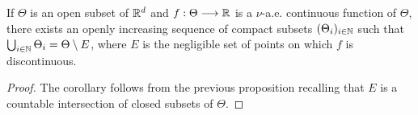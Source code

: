 \begin{cor}
    If $\Theta$ is an open subset of $\mathbb{R}^d$ and $f:\Theta\longrightarrow\mathbb{R}$ is a $\nu$-a.e. continuous function of $\Theta$, there exists an openly increasing sequence of compact subsets $(\Theta_i)_{i\in\mathbb{N}}$  such that $\bigcup_{i\in\mathbb{N}}\Theta_i = \Theta\setminus E$, where $E$ is the negligible set of points on which $f$ is discontinuous.
\end{cor}

\begin{proof}
    The corollary follows from the previous proposition recalling that $E$ is a countable intersection of closed subsets of $\Theta$.
\end{proof}








